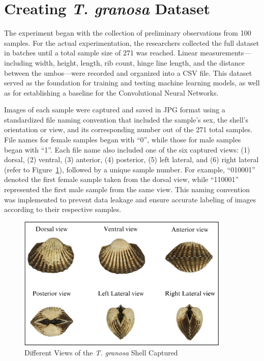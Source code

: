 \section{Creating \textit{T. granosa} Dataset}
\label{sec:dataset}

The experiment began with the collection of preliminary observations from 100 \Tgranosa samples. For the actual experimentation, the researchers collected the full dataset in batches until a total sample size of 271 \Tgranosa was reached. Linear measurements—including width, height, length, rib count, hinge line length, and the distance between the umbos—were recorded and organized into a CSV file. This dataset served as the foundation for training and testing machine learning models, as well as for establishing a baseline for the Convolutional Neural Networks.

Images of each sample were captured and saved in JPG format using a standardized file naming convention that included the sample's sex, the shell's orientation or view, and its corresponding number out of the 271 total samples. File names for female \Tgranosa samples began with “0”, while those for male samples began with “1”. Each file name also included one of the six captured views: (1) dorsal, (2) ventral, (3) anterior, (4) posterior, (5) left lateral, and (6) right lateral (refer to Figure~\ref{fig:granosa_views}), followed by a unique sample number. For example, “010001” denoted the first female sample taken from the dorsal view, while “110001” represented the first male sample from the same view. This naming convention was implemented to prevent data leakage and ensure accurate labeling of images according to their respective samples.

\begin{figure}[!htbp]
	\centering
	\includegraphics[width=0.9\textwidth]{figures/view.png}
	\caption{Different Views of the \textit{T. granosa} Shell Captured}
	\label{fig:granosa_views}
\end{figure}

